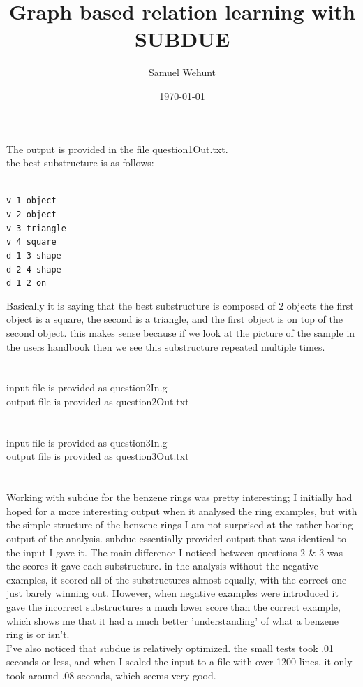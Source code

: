 \documentclass{article}
\title{Graph based relation learning with SUBDUE}
\author{Samuel Wehunt}
\date{\today}
\begin{document}
\maketitle

\section{}
The output is provided in the file question1Out.txt.\\
the best substructure is as follows:

\texttt{
\\
v 1 object\\
v 2 object\\
v 3 triangle\\
v 4 square\\
d 1 3 shape\\
d 2 4 shape\\
d 1 2 on\\
}

Basically it is saying that the best substructure is composed of 2 objects
the first object is a square, the second is a triangle, and the first object 
is on top of the second object. this makes sense because if we look at the 
picture of the sample in the users handbook then we see this substructure
repeated multiple times.

\section{}
input file is provided as question2In.g\\
output file is provided as question2Out.txt

\section{}
input file is provided as question3In.g\\
output file is provided as question3Out.txt

\section{}
Working with subdue for the benzene rings was pretty interesting; I initially
had hoped for a more interesting output when it analysed the ring examples,
but with the simple structure of the benzene rings I am not surprised at the
rather boring output of the analysis. subdue essentially provided output
that was identical to the input I gave it. The main difference I noticed 
between questions 2 \& 3 was the scores it gave each substructure. in the
analysis without the negative examples, it scored all of the substructures
almost equally, with the correct one just barely winning out. However, when
negative examples were introduced it gave the incorrect substructures a much
lower score than the correct example, which shows me that it had a much better
'understanding' of what a benzene ring is or isn't.\\
I've also noticed that subdue is relatively optimized. the small tests took .01
seconds or less, and when I scaled the input to a file with over 1200 lines, it
only took around .08 seconds, which seems very good.
\end{document}
